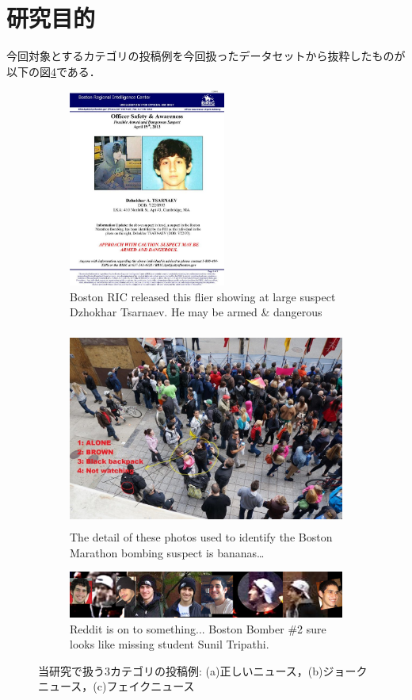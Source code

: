 \section{研究目的}
\label{ch:purpose}
%
今回対象とするカテゴリの投稿例を今回扱ったデータセットから抜粋したものが以下の図\ref{fig:examples}である．

\begin{figure}[ht]
    \centering
    \begin{subfigure}[b]{0.4\textwidth}
        \includegraphics[height=6.5cm]{images/real_example_boston.jpg}
        \caption{Boston RIC released this flier showing at large suspect Dzhokhar Tsarnaev. He may be armed \& dangerous}
        \label{fig:real}
    \end{subfigure}
    \hfill %
    \begin{subfigure}[b]{0.57\textwidth}
        \includegraphics[height=6.5cm]{images/humor_example_boston.jpg}
        \caption{The detail of these photos used to identify the Boston Marathon bombing suspect is bananas…}
        \label{fig:humor}
    \end{subfigure}
    \bigskip 
    \centering
    \begin{subfigure}[b]{\textwidth}
        \includegraphics[width=\textwidth]{images/fake_example_boston.jpg}
        \caption{Reddit is on to something... Boston Bomber \#2 sure looks like missing student Sunil Tripathi. }
        \label{fig:fake}
    \end{subfigure}
    \caption{当研究で扱う3カテゴリの投稿例: (a)正しいニュース，(b)ジョークニュース，(c)フェイクニュース}
    \label{fig:examples}
\end{figure}

